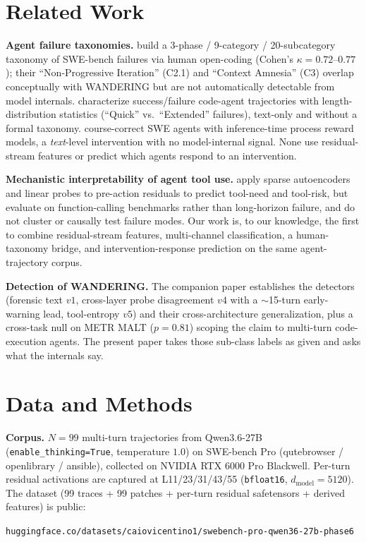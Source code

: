 \documentclass[11pt]{article}
\begin{document}
\section{Related Work}

\textbf{Agent failure taxonomies.} \cite{liu2026failures} build a 3-phase / 9-category / 20-subcategory taxonomy of SWE-bench failures via human open-coding (Cohen's $\kappa{=}0.72$--$0.77$); their ``Non-Progressive Iteration'' (C2.1) and ``Context Amnesia'' (C3) overlap conceptually with WANDERING but are not automatically detectable from model internals. \cite{majgaonkar2026codeagent} characterize success/failure code-agent trajectories with length-distribution statistics (``Quick'' vs.\ ``Extended'' failures), text-only and without a formal taxonomy. \cite{whenagents2026} course-correct SWE agents with inference-time process reward models, a \emph{text}-level intervention with no model-internal signal. None use residual-stream features or predict which agents respond to an intervention.

\textbf{Mechanistic interpretability of agent tool use.} \cite{beyondblackbox2026} apply sparse autoencoders and linear probes to pre-action residuals to predict tool-need and tool-risk, but evaluate on function-calling benchmarks rather than long-horizon failure, and do not cluster or causally test failure modes. Our work is, to our knowledge, the first to combine residual-stream features, multi-channel classification, a human-taxonomy bridge, and intervention-response prediction on the same agent-trajectory corpus.

\textbf{Detection of WANDERING.} The companion paper \cite{toolentropy2026} establishes the detectors (forensic text $v1$, cross-layer probe disagreement $v4$ with a $\sim$15-turn early-warning lead, tool-entropy $v5$) and their cross-architecture generalization, plus a cross-task null on METR MALT ($p{=}0.81$) scoping the claim to multi-turn code-execution agents. The present paper takes those sub-class labels as given and asks what the internals say.

\section{Data and Methods}

\textbf{Corpus.} $N{=}99$ multi-turn trajectories from Qwen3.6-27B (\texttt{enable\_thinking=True}, temperature $1.0$) on SWE-bench Pro (qutebrowser / openlibrary / ansible), collected on NVIDIA RTX 6000 Pro Blackwell. Per-turn residual activations are captured at L11/23/31/43/55 (\texttt{bfloat16}, $d_{\text{model}}{=}5120$). The dataset (99 traces + 99 patches + per-turn residual safetensors + derived features) is public:
\begin{center}\small\texttt{huggingface.co/datasets/caiovicentino1/swebench-pro-qwen36-27b-phase6}\end{center}
\end{document}
